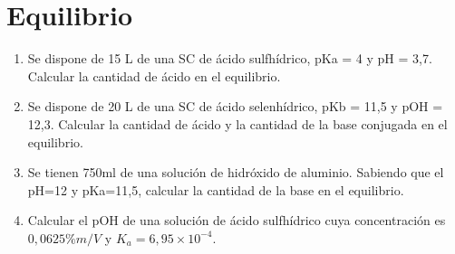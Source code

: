 \section{Equilibrio}

\begin{enumerate}
    \item Se dispone de 15 L de una SC de ácido sulfhídrico, pKa = 4 y pH = 3,7. Calcular la cantidad de ácido en el equilibrio.
    \item Se dispone de 20 L de una SC de ácido selenhídrico, pKb = 11,5 y pOH = 12,3. Calcular la cantidad de ácido y la cantidad de la base conjugada en el equilibrio.
    \item Se tienen 750ml de una solución de hidróxido de aluminio. Sabiendo que el pH=12 y pKa=11,5, calcular la cantidad de la base en el equilibrio.
    \item Calcular el pOH de una solución de ácido sulfhídrico cuya concentración es $0,0625 \%m/V$ y $K_a = 6,95 \times 10^{-4}$.
\end{enumerate}
